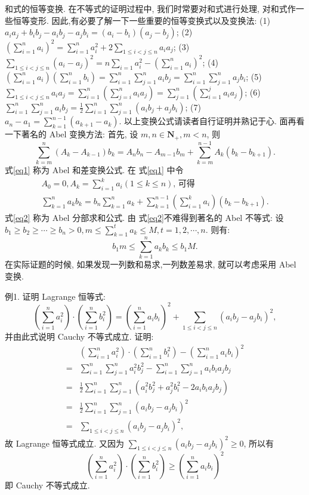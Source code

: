
和式的恒等变换.
在不等式的证明过程中, 我们时常要对和式进行处理, 对和式作一些恒等变形.
因此,有必要了解一下一些重要的恒等变换式以及变换法:
(1) $a_i a_j+b_i b_j-a_i b_j-a_j b_i=\left(a_i-b_i\right)\left(a_j-b_j\right)$;
(2) $\left(\sum_{i=1}^n a_i\right)^2=\sum_{i=1}^n a_i^2+2 \sum_{1 \leqslant i<j \leqslant n} a_i a_j$;
(3) $\sum_{1 \leqslant i<j \leqslant n}\left(a_i-a_j\right)^2=n \sum_{i=1} a_i^2-\left(\sum_{i=1}^n a_i\right)^2$;
(4) $\left(\sum_{i=1}^n a_i\right)\left(\sum_{i=1}^n b_i\right)=\sum_{i=1}^n \sum_{j=1}^n a_i b_j=\sum_{i=1}^n \sum_{j=1}^n a_j b_i$;
(5) $\sum_{1 \leqslant i<j \leqslant n} a_i a_j=\sum_{i=1}^n\left(\sum_{j=i}^n a_i a_j\right)=\sum_{j=1}^n\left(\sum_{i=1}^j a_i a_j\right)$;
(6) $\sum_{i=1}^n \sum_{j=1}^n a_i b_j=\frac{1}{2} \sum_{i=1}^n \sum_{j=1}^n\left(a_i b_j+a_j b_i\right)$;
(7) $a_n-a_1=\sum_{k=1}^{n-1}\left(a_{k+1}-a_k\right)$.
以上变换公式请读者自行证明并熟记于心.
面再看一下著名的 Abel 变换方法:
首先, 设 $m, n \in \mathbf{N}_{+}, m<n$, 则
$$
\sum_{k=m}^n\left(A_k-A_{k-1}\right) b_k=A_n b_n-A_{m-1} b_m+\sum_{k=m}^{n-1} A_k\left(b_k-b_{k+1}\right) . \label{eq1}
$$
式\ref{eq1} 称为 Abel 和差变换公式.
在 式\ref{eq1} 中令 
$$
\begin{aligned}
A_0=0, A_k=\sum_{i=1}^k a_i(1 \leqslant k \leqslant n) \text {, 可得 } \\
\sum_{k=1}^n a_k b_k=b_n \sum_{k=1}^n a_k+\sum_{k=1}^{n-1}\left(\sum_{i=1}^k a_i\right)\left(b_k-b_{k+1}\right) .
\end{aligned} \label{eq2}
$$
式\ref{eq2} 称为 Abel 分部求和公式.
由 式\ref{eq2}不难得到著名的 Abel 不等式:
设 $b_1 \geqslant b_2 \geqslant \cdots \geqslant b_n>0, m \leqslant \sum_{k=1}^t a_k \leqslant M, t=1,2, \cdots, n$. 则有:
$$
b_1 m \leqslant \sum_{k=1}^n a_k b_k \leqslant b_1 M . \label{eq3}
$$
在实际证题的时候, 如果发现一列数和易求,一列数差易求, 就可以考虑采用 Abel 变换.



例1. 证明 Lagrange 恒等式:
$$
\left(\sum_{i=1}^n a_i^2\right) \cdot\left(\sum_{i=1}^n b_i^2\right)=\left(\sum_{i=1}^n a_i b_i\right)^2+\sum_{1 \leqslant i<j \leqslant n}\left(a_i b_j-a_j b_i\right)^2,
$$
并由此式说明 Cauchy 不等式成立.
证明:$$
\begin{aligned}
& \left(\sum_{i=1}^n a_i^2\right) \cdot\left(\sum_{i=1}^n b_i^2\right)-\left(\sum_{i=1}^n a_i b_i\right)^2 \\
= & \sum_{i=1}^n \sum_{j=1}^n a_i^2 b_j^2-\sum_{i=1}^n \sum_{j=1}^n a_i b_i a_j b_j \\
= & \frac{1}{2} \sum_{i=1}^n \sum_{j=1}^n\left(a_i^2 b_j^2+a_j^2 b_i^2-2 a_i b_i a_j b_j\right) \\
= & \frac{1}{2} \sum_{i=1}^n \sum_{j=1}^n\left(a_i b_j-a_j b_i\right)^2 \\
= & \sum_{1 \leqslant i<j \leqslant n}\left(a_i b_j-a_j b_i\right)^2,
\end{aligned}
$$
故 Lagrange 恒等式成立.
又因为 $\sum_{1 \leqslant i<j \leqslant n}\left(a_i b_j-a_j b_i\right)^2 \geqslant 0$, 所以有
$$
\left(\sum_{i=1}^n a_i^2\right) \cdot\left(\sum_{i=1}^n b_i^2\right) \geqslant\left(\sum_{i=1}^n a_i b_i\right)^2
$$
即 Cauchy 不等式成立.



